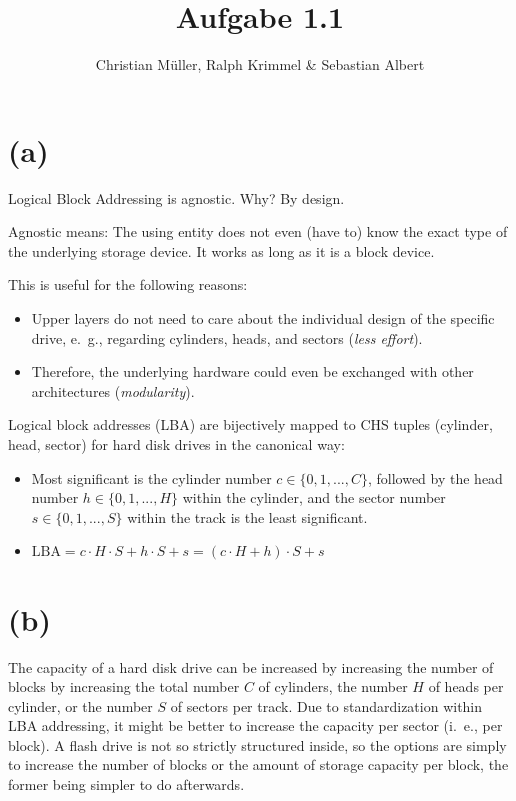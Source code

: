 \documentclass{article}
\begin{document}
\title{Aufgabe 1.1}
\author{Christian Müller, Ralph Krimmel \& Sebastian Albert }
\section{(a)}
Logical Block Addressing is agnostic. Why? By design.

Agnostic means: The using entity does not even (have to) know the exact type of the underlying storage device. It works as long as it is a block device.

This is useful for the following reasons:
\begin{itemize}
\item Upper layers do not need to care about the individual design of the specific drive, e.~g., regarding cylinders, heads, and sectors (\emph{less effort}).
\item Therefore, the underlying hardware could even be exchanged with other architectures (\emph{modularity}).
\end{itemize}

Logical block addresses (LBA) are bijectively mapped to CHS tuples (cylinder, head, sector) for hard disk drives in the canonical way:
\begin{itemize}
\item Most significant is the cylinder number $c \in \{0, 1, ..., C\}$, followed by the head number $h \in \{0, 1, ..., H\}$ within the cylinder, and the sector number $s \in \{0, 1, ..., S\}$ within the track is the least significant.
\item $\text{LBA} = c \cdot H \cdot S + h \cdot S + s = (c \cdot H + h) \cdot S + s$
\end{itemize}
\section{(b)}
The capacity of a hard disk drive can be increased by increasing the number of blocks by increasing the total number $C$ of cylinders, the number $H$ of heads per cylinder, or the number $S$ of sectors per track.
Due to standardization within LBA addressing, it might be better to increase the capacity per sector (i.~e., per block).
A flash drive is not so strictly structured inside, so the options are simply to increase the number of blocks or the amount of storage capacity per block, the former being simpler to do afterwards.
\end{document}
